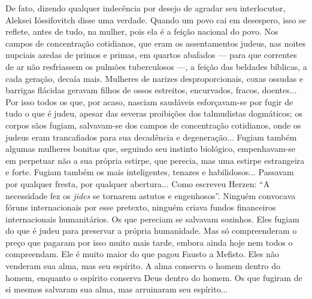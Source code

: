 De fato, dizendo qualquer indecência por desejo de agradar seu
interlocutor, Aleksei Ióssifovitch disse uma verdade. Quando um povo cai
em desespero, isso se reflete, antes de tudo, na mulher, pois ela é a
feição nacional do povo. Nos campos de concentração cotidianos, que eram
os assentamentos judeus, nas noites nupciais azedas de primos e primas,
em quartos abafados --- para que correntes de ar não resfriassem os
pulmões tuberculosos ---, a feição das beldades bíblicas, a cada
geração, decaía mais. Mulheres de narizes desproporcionais, coxas
ossudas e barrigas flácidas geravam filhos de ossos estreitos,
encurvados, fracos, doentes... Por isso todos os que, por acaso, nasciam
saudáveis esforçavam-se por fugir de tudo o que é judeu, apesar das
severas proibições dos talmudistas dogmáticos; os corpos sãos fugiam,
salvavam-se dos campos de concentração cotidianos, onde os judeus eram
trancafiados para sua decadência e degeneração... Fugiam também algumas
mulheres bonitas que, seguindo seu instinto biológico, empenhavam-se em
perpetuar não a sua própria estirpe, que perecia, mas uma estirpe
estrangeira e forte. Fugiam também os mais inteligentes, tenazes e
habilidosos... Passavam por qualquer fresta, por qualquer abertura...
Como escreveu Herzen: ``A necessidade fez os \emph{jides} se tornarem
astutos e engenhosos''. Ninguém convocava fóruns internacionais por esse
pretexto, ninguém criava fundos financeiros internacionais humanitários.
Os que pereciam se salvavam sozinhos. Eles fugiam do que é judeu para
preservar a própria humanidade. Mas só compreenderam o preço que pagaram
por isso muito mais tarde, embora ainda hoje nem todos o compreendam.
Ele é muito maior do que pagou Fausto a Mefisto. Eles não venderam sua
alma, mas seu espírito. A alma conserva o homem dentro do homem,
enquanto o espírito conserva Deus dentro do homem. Os que fugiram de si
mesmos salvaram sua alma, mas arruinaram seu espírito...


